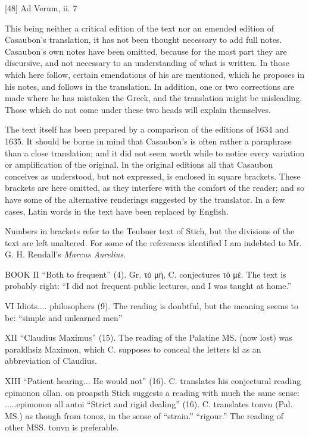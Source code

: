 [48]
Ad Verum, ii. 7


This being neither a critical edition of the text nor an emended edition
of Casaubon's translation, it has not been thought necessary to add full
notes. Casaubon's own notes have been omitted, because for the most part
they are discursive, and not necessary to an understanding of what is
written. In those which here follow, certain emendations of his are
mentioned, which he proposes in his notes, and follows in the translation.
In addition, one or two corrections are made where he has mistaken the
Greek, and the translation might be misleading. Those which do not come
under these two heads will explain themselves.

The text itself has been prepared by a comparison of the editions of 1634
and 1635. It should be borne in mind that Casaubon's is often rather a
paraphrase than a close translation; and it did not seem worth while to
notice every variation or amplification of the original. In the original
editions all that Casaubon conceives as understood, but not expressed, is
enclosed in square brackets. These brackets are here omitted, as they
interfere with the comfort of the reader; and so have some of the
alternative renderings suggested by the translator. In a few cases, Latin
words in the text have been replaced by English.

Numbers in brackets refer to the Teubner text of Stich, but the divisions
of the text are left unaltered. For some of the references identified I am
indebted to Mr. G. H. Rendall's \emph{Marcus Aurelius}.

BOOK II ``Both to frequent'' (4). Gr. τὸ μή, C.
conjectures τὸ μὲ. The text is probably right: ``I
did not frequent public lectures, and I was taught at home.''

VI Idiots.... philosophers (9). The reading is doubtful, but the meaning
seems to be: ``simple and unlearned men''

XII ``Claudius Maximus'' (15). The reading of the Palatine MS. (now lost)
was paraklhsiz Maximon, which C. supposes to conceal the letters kl as an
abbreviation of Claudius.

XIII ``Patient hearing... He would not'' (16). C. translates his conjectural
reading epimonon ollan. on proapsth Stich suggests a reading with much the
same sense: .....epimonon all antoi ``Strict and rigid dealing'' (16). C.
translates tonvn (Pal. MS.) as though from tonoz, in the sense of
``strain.'' ``rigour.'' The reading of other MSS. tonvn is preferable.

